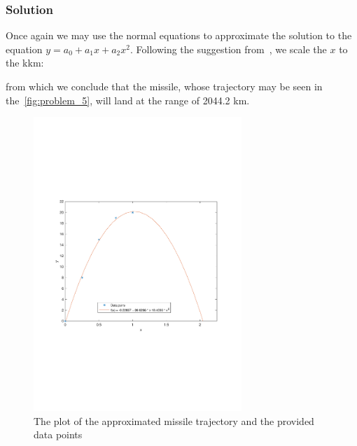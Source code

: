 \subsubsection*{Solution}
Once again we may use the normal equations to approximate the solution to the equation
$y = a_0 + a_1x + a_2x^2$.
Following the suggestion from~\cite{Meyer}, we scale the $x$ to the kkm:

from which we conclude that the missile, whose trajectory may be seen in
the~\autoref{fig:problem_5}, will land at the range of 2044.2 km.
\begin{figure}
  \centering
  \includegraphics[width=0.7\textwidth]{images/Problem_5_plot.pdf}
  \caption{The plot of the approximated missile trajectory and the provided data points}
  \label{fig:problem_5}
\end{figure}

